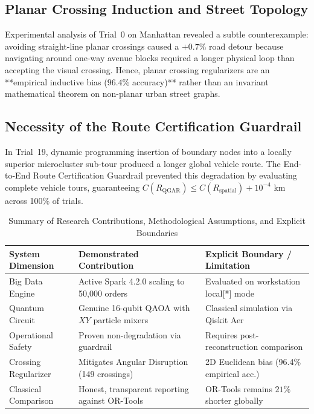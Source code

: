 \documentclass[journal,10pt]{IEEEtran}
\begin{document}
\subsection{Planar Crossing Induction and Street Topology}
Experimental analysis of Trial~0 on Manhattan revealed a subtle counterexample: avoiding straight-line planar crossings caused a $+0.7\%$ road detour because navigating around one-way avenue blocks required a longer physical loop than accepting the visual crossing. Hence, planar crossing regularizers are an **empirical inductive bias ($96.4\%$ accuracy)** rather than an invariant mathematical theorem on non-planar urban street graphs.

\subsection{Necessity of the Route Certification Guardrail}
In Trial~19, dynamic programming insertion of boundary nodes into a locally superior microcluster sub-tour produced a longer global vehicle route. The End-to-End Route Certification Guardrail prevented this degradation by evaluating complete vehicle tours, guaranteeing $C(R_{\text{QGAR}}) \le C(R_{\text{spatial}}) + 10^{-4}\text{ km}$ across 100\% of trials.

\begin{table}[t]
\caption{Summary of Research Contributions, Methodological Assumptions, and Explicit Boundaries}
\label{tab:contributions_limitations}
\centering
\begin{tabular}{lll}
\toprule
\textbf{System Dimension} & \textbf{Demonstrated Contribution} & \textbf{Explicit Boundary / Limitation} \\
\midrule
Big Data Engine & Active Spark 4.2.0 scaling to 50,000 orders & Evaluated on workstation local[*] mode \\
Quantum Circuit & Genuine 16-qubit QAOA with $XY$ particle mixers & Classical simulation via Qiskit Aer \\
Operational Safety & Proven non-degradation via guardrail & Requires post-reconstruction comparison \\
Crossing Regularizer & Mitigates Angular Disruption (149 crossings) & 2D Euclidean bias (96.4\% empirical acc.) \\
Classical Comparison & Honest, transparent reporting against OR-Tools & OR-Tools remains $21\%$ shorter globally \\
\bottomrule
\end{tabular}
\end{table}
\end{document}
